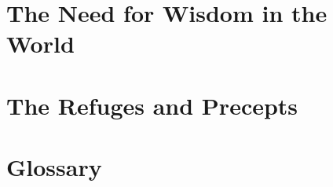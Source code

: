 \documentclass[11pt,twoside,draft]{memoir}
\begin{document}
\chapter{The Need for Wisdom in the World}



\backmatter



\chapter{The Refuges and Precepts}

\chapter{Glossary}



\cleartorecto
\thispagestyle{plain}


\emptysheet
\end{document}
